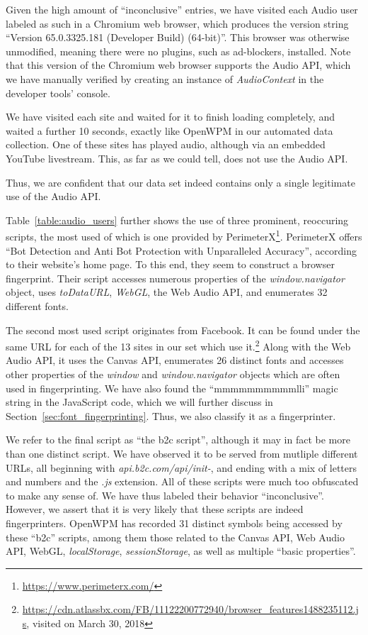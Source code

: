 \documentclass[
    fontsize=12pt,
    headings=small,
    parskip=half,
    bibliography=totoc,
    numbers=noenddot,
    open=any
    ]{scrreprt}
\begin{document}
Given the high amount of ``inconclusive'' entries, we have visited each Audio user labeled as such
in a Chromium web browser, which produces the version string ``Version 65.0.3325.181 (Developer Build) (64-bit)''.
This browser was otherwise unmodified, meaning there were no plugins, such as ad-blockers, installed.
Note that this version of the Chromium web browser supports the Audio API, which we have manually verified
by creating an instance of \textit{AudioContext} in the developer tools' console.

We have visited each site and waited for it to finish loading completely, and waited a further 10 seconds,
exactly like OpenWPM in our automated data collection.
One of these sites has played audio, although via an embedded YouTube livestream.
This, as far as we could tell, does not use the Audio API.

Thus, we are confident that our data set indeed contains only a single legitimate use of
the Audio API.

Table~\ref{table:audio_users} further shows the use of three prominent, reoccuring scripts, the most used
of which is one provided by PerimeterX\footnote{\url{https://www.perimeterx.com/}}.
PerimeterX offers ``Bot Detection and Anti Bot Protection with Unparalleled Accuracy'',
according to their website's home page. To this end, they seem to construct a browser fingerprint.
Their script accesses numerous properties of the \textit{window.navigator} object, uses \textit{toDataURL},
\textit{WebGL}, the Web Audio API, and enumerates 32 different fonts.

The second most used script originates from Facebook. It can be found under the same URL
for each of the 13 sites in our set which use it.\footnote{\url{https://cdn.atlassbx.com/FB/11122200772940/browser_features1488235112.js}, visited on March 30, 2018}
Along with the Web Audio API, it uses the Canvas API, enumerates 26 distinct fonts and accesses other
properties of the \textit{window} and \textit{window.navigator} objects which are often used in fingerprinting.
We have also found the ``mmmmmmmmmmlli'' magic string in the JavaScript code, which we will further discuss
in Section~\ref{sec:font_fingerprinting}.
Thus, we also classify it as a fingerprinter.

We refer to the final script as ``the b2c script'', although it may in fact be more than one distinct
script. We have observed it to be served from mutliple different URLs,
all beginning with \textit{api.b2c.com/api/init-}, and ending with a mix of letters and numbers and the \textit{.js} extension.
All of these scripts were much too obfuscated to make any sense of. We have thus labeled their behavior ``inconclusive''.
However, we assert that it is very likely that these scripts are indeed fingerprinters.
OpenWPM has recorded 31 distinct symbols being accessed by these ``b2c'' scripts, among them
those related to the Canvas API, Web Audio API, WebGL, \textit{localStorage}, \textit{sessionStorage},
as well as multiple ``basic properties''.
\end{document}
